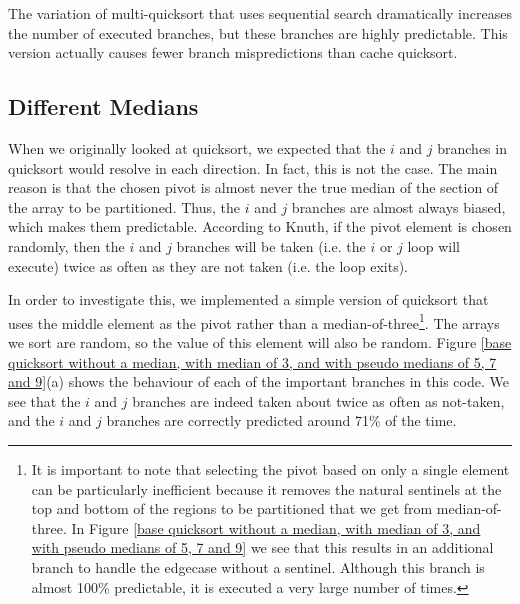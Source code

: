 The variation of multi-quicksort that uses sequential search dramatically
increases the number of executed branches, but these branches are highly
predictable. This version actually causes fewer branch mispredictions
than cache quicksort.


\subsection{Different Medians}

\label{quick-predictors2}

\label{quicksort entropy}
When we originally looked at quicksort, we expected that the $i$ and
$j$ branches in quicksort would resolve in each direction. In fact,
this is not the case. The main reason is that the chosen pivot is
almost never the true median of the section of the array to be
partitioned. Thus, the $i$ and $j$ branches are almost always biased,
which makes them predictable. According to Knuth, if the pivot element
is chosen randomly, then the $i$ and $j$ branches will be taken (i.e.
the $i$ or $j$ loop will execute) twice as often as they are not taken
(i.e. the loop exits).

In order to investigate this, we implemented a simple version of
quicksort that uses the middle element as the pivot rather than a
median-of-three\footnote{It is important to note that selecting
the pivot based on only a single element can be particularly inefficient
because it removes the natural sentinels at the top and bottom
of the regions to be partitioned that we get from median-of-three. In
Figure \ref{base quicksort without a median, with median of 3, and with pseudo medians of 5, 7 and 9} we see that this results in an additional branch to handle
the edgecase without a sentinel. Although this branch is almost 100\%
predictable, it is executed a very large number of times.}. The arrays we sort are random, so the value of this
element will also be random. Figure \ref{base quicksort without a median, with median of 3, and with pseudo medians of 5, 7 and 9}(a)
shows the behaviour of each of the important branches in this code. We
see that the $i$ and $j$ branches are indeed taken about twice as
often as not-taken, and the $i$ and $j$ branches are correctly
predicted around 71\% of the time.

